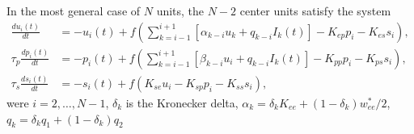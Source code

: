 \documentclass[a4paper,10pt]{article}
\begin{document}
In the most general case of $N$ units, the $N-2$ center units satisfy the system
\begin{equation}\label{eq:wc_space}
 \begin{split}
 \frac{d u_i(t)}{d t} &= -u_i(t) + f\left(\sum_{k=i-1}^{i+1} \left[\alpha_{k-i} u_k +  q_{k-i} I_k(t) \right]- K_{ep}p_i - K_{es}s_i \right),\\
 \tau_p\frac{d p_i(t)}{d t} &= -p_i(t) + f\left(\sum_{k=i-1}^{i+1} \left[\beta_{k-i} u_i + q_{k-i} I_k(t) \right] - K_{pp}p_i - K_{ps}s_i \right),\\
 \tau_s\frac{d s_i(t)}{d t} &= -s_i(t) + f(K_{se}u_i - K_{sp}p_i - K_{ss}s_i),
 \end{split}
\end{equation}
were $i=2,\ldots,N-1$, $\delta_k$ is the Kronecker delta, $\alpha_k = \delta_k K_{ee} + (1-\delta_k)w_{ee}^*/2$, $q_k = \delta_k q_1  + (1-\delta_k)q_2$




\end{document}
